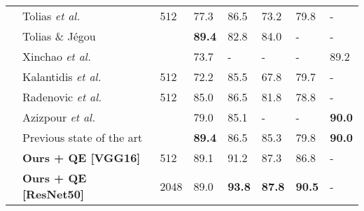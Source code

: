 \documentclass[runningheads]{llncs}
\def\etal{\emph{et al.}~}
\begin{document}
\begin{table}[h]
\begin{tabularx}{\textwidth}{@{}p{0.5cm}p{3.7cm}p{0.8cm}YYYYY@{}}
 &{\scriptsize Tolias \etal \cite{Tolias2016}} & {\scriptsize 512} & 77.3  &86.5 &  73.2    &79.8 & -  \\
 &{\scriptsize Tolias \& J\'egou \cite{Tolias2015b}} &&\textbf{89.4} & 82.8 & 84.0  & - & - \\
 &{\scriptsize Xinchao \etal \cite{Xinchao2015}} &&73.7  & - & -  & - & 89.2 \\
 &{\scriptsize Kalantidis \etal \cite{Kalantidis2015}} & {\scriptsize 512}& 72.2  & 85.5 & 67.8  & 79.7 &  - \\
 &{\scriptsize Radenovic \etal \cite{Radenovic2016}} & {\scriptsize 512}& 85.0 &86.5 & 81.8 & 78.8  & - \\
 &{\scriptsize Azizpour \etal \cite{Azizpour2015}} &  & 79.0 & 85.1 & -  & -  & \textbf{90.0} \\
 & Previous state of the art & & \textbf{89.4} \cite{Tolias2015b} & 86.5 \cite{Tolias2016} & 85.3 \cite{Tolias2015} & 79.8 \cite{Tolias2016} & \textbf{90.0} \cite{Azizpour2015}\\
 &{\footnotesize \textbf{Ours + QE [VGG16]}} & {\scriptsize 512} & 89.1 & 91.2 & 87.3 & 86.8 & - \\ 
 &{\footnotesize \textbf{Ours + QE [ResNet50]}} & {\scriptsize 2048} & 89.0  & \textbf{93.8} & \textbf{87.8} & \textbf{90.5} & - \\ 
 \bottomrule
 \end{tabularx}
 \end{table}

 
 
\end{document}
